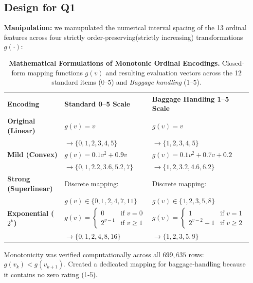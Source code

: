 \documentclass[10pt,a4paper]{article}
\begin{document}
\subsection{Design for Q1}
\textbf{Manipulation:} we manupulated the numerical interval spacing of the 13 ordinal features across four strictly order-preserving(strictly increasing) transformations $g(\cdot)$:
\begin{table}[htbp]
    \centering
    \small
    \caption{\textbf{Mathematical Formulations of Monotonic Ordinal Encodings.} Closed-form mapping functions $g(v)$ and resulting
    evaluation vectors across the 12 standard items ($0$--$5$) and \emph{Baggage handling} ($1$--$5$).}
    \label{tab:encoding_formulations}
    \begin{tabular}{@{}lll@{}}
    \toprule
    \textbf{Encoding} & \textbf{Standard 0--5 Scale} & \textbf{Baggage Handling 1--5 Scale} \\
    \midrule
    \textbf{Original (Linear)} 
      & $g(v) = v$ 
      & $g(v) = v$ \\
      & $\to \{0, 1, 2, 3, 4, 5\}$ 
      & $\to \{1, 2, 3, 4, 5\}$ \\[4pt]

    \textbf{Mild (Convex)} 
      & $g(v) = 0.1 v^2 + 0.9 v$ 
      & $g(v) = 0.1 v^2 + 0.7 v + 0.2$ \\
      & $\to \{0, 1, 2.2, 3.6, 5.2, 7\}$ 
      & $\to \{1, 2, 3.2, 4.6, 6.2\}$ \\[4pt]

    \textbf{Strong (Superlinear)} 
      & Discrete mapping: 
      & Discrete mapping: \\
      & $g(v) \in \{0, 1, 2, 4, 7, 11\}$ 
      & $g(v) \in \{1, 2, 3, 5, 8\}$ \\[4pt]

    \textbf{Exponential ($2^k$)} 
      & $g(v) = \begin{cases} 0 & \text{if } v = 0 \\ 2^{v-1} & \text{if } v \ge 1 \end{cases}$ 
      & $g(v) = \begin{cases} 1 & \text{if } v = 1 \\ 2^{v-2} + 1 & \text{if } v \ge 2 \end{cases}$ \\[6pt]
      & $\to \{0, 1, 2, 4, 8, 16\}$ 
      & $\to \{1, 2, 3, 5, 9\}$ \\
    \bottomrule
    \end{tabular}
    \end{table}
Monotonicity was verified computationally across all $699{,}635$ rows: $g(v_k) < g(v_{k+1})$. Created a dedicated mapping for baggage-handling because it contains no zero rating (1-5).
\end{document}
